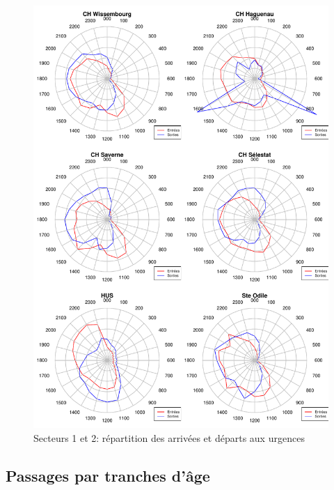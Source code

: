\documentclass[12pt,english,french,twoside]{report}\usepackage[]{graphicx}\usepackage[]{color}
\makeatletter
\def\maxwidth{ %
  \ifdim\Gin@nat@width>\linewidth
    \linewidth
  \else
    \Gin@nat@width
  \fi
}
\newenvironment{knitrout}{}{} %
\makeatother
\begin{document}
\begin{figure}
\begin{center}
\begin{knitrout}
\color{fgcolor}
\includegraphics[width=\maxwidth]{figure/test27} 

\end{knitrout}

\end{center}
\caption{Secteurs 1 et 2: répartition des arrivées et départs aux urgences}
\label{passage:secteur12}
\end{figure}



\subsection{Passages par tranches d'âge}
\end{document}
